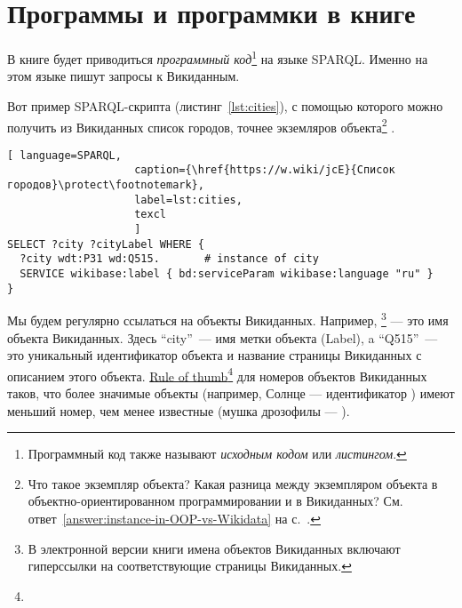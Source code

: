 \chapter{Программы и программки в книге}
\label{ch:listing_about}

В книге будет приводиться \emph{программный код}\footnote[][0cm]{%
    Программный код также называют  \emph{исходным кодом} или 
    \emph{листингом}.
%   
} на языке SPARQL. 
Именно на этом языке пишут запросы к Викиданным.


Вот пример SPARQL-скрипта (листинг~\ref{lst:cities}), 
с помощью которого можно получить из Викиданных список городов, 
точнее экземляров объекта\footnote{\label{question:instance-in-OOP-vs-Wikidata}Что такое экземпляр объекта? 
    Какая разница между экземпляром объекта 
    в объектно-ориентированном программировании и в Викиданных?
    См. ответ~\ref{answer:instance-in-OOP-vs-Wikidata} на с.~\pageref{answer:instance-in-OOP-vs-Wikidata}.
    }
.

\begin{lstlisting}[ language=SPARQL, 
                    caption={\href{https://w.wiki/jcE}{Список городов}\protect\footnotemark},
                    label=lst:cities,
                    texcl 
                    ]
SELECT ?city ?cityLabel WHERE { 
  ?city wdt:P31 wd:Q515.       # instance of city
  SERVICE wikibase:label { bd:serviceParam wikibase:language "ru" }
}
\end{lstlisting}%

Мы будем регулярно ссылаться на объекты Викиданных. 
Например, \footnote[][0cm]{%
%    
    В электронной версии книги имена объектов Викиданных включают гиперссылки на соответствующие страницы Викиданных.
} 
--- это имя объекта Викиданных. 
Здесь ``city''~--- имя метки объекта (Label), 
a ``Q515''~--- это уникальный идентификатор объекта 
и название страницы Викиданных с описанием этого объекта.
\href{https://en.wikipedia.org/wiki/Rule_of_thumb}{Rule of thumb}\footnote[][0cm]{%
%
} 
для номеров объектов Викиданных таков, что более значимые объекты 
(например, Солнце --- идентификатор ) 
имеют меньший номер, чем менее известные
(мушка дрозофилы --- ).
